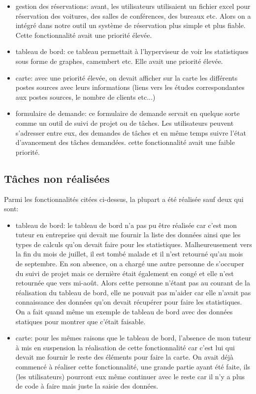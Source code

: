 \begin{itemize}
\item gestion des réservations: avant, les utilisateurs utilisaient un fichier excel pour réservation des voitures, des salles de conférences, des bureaux etc. Alors on a intégré dans notre outil un système de réservation plus simple et plus fiable. Cette fonctionnalité avait une priorité élevée.
\item tableau de bord: ce tableau permettait à l'hyperviseur de voir les statistiques sous forme de graphes, camembert etc. Elle avait une priorité élevée.
\item carte: avec une priorité élevée, on devait afficher sur la carte les différents postes sources avec leurs informations (liens vers les études correspondantes aux postes sources, le nombre de clients etc...)
\item formulaire de demande: ce formulaire de demande servait en quelque sorte comme un outil de suivi de projet ou de tâches. Les utilisateurs peuvent s'adresser entre eux, des demandes de tâches et en même temps suivre l'état d'avancement des tâches demandées. cette fonctionnalité avait une faible priorité.
\end{itemize}
\subsection*{Tâches non réalisées}\label{nonrealise}
Parmi les fonctionnalités citées ci-dessus, la plupart a été réalisée sauf deux qui sont: 
\begin{itemize}
\item tableau de bord: le tableau de bord n'a pas pu être réalisée car c'est mon tuteur en entreprise qui devait me fournir la liste des données ainsi que les types de calculs qu'on devait faire pour les statistiques. Malheureusement vers la fin du mois de juillet, il est tombé malade et il n'est retourné qu'au mois de septembre. En son absence, on a chargé une autre personne de s'occuper du suivi de projet mais ce dernière était également en congé et elle n'est retournée que vers mi-août. Alors cette personne n'étant pas au courant de la réalisation du tableau de bord, elle ne pouvait pas m'aider car elle n'avait pas connaissance des données qu'on devait récupérer pour faire les statistiques.\\
On a fait quand même un exemple de tableau de bord avec des données statiques pour montrer que c'était faisable.
\item carte: pour les mêmes raisons que le tableau de bord, l'absence de mon tuteur à mis en suspension la réalisation de cette fonctionnalité car c'est lui qui devait me fournir le reste des éléments pour faire la carte. On avait déjà commencé à réaliser cette fonctionnalité, une grande partie ayant été faite, ils (les utilisateurs) pourront eux même continuer avec le reste car il n'y a plus de code à faire mais juste la saisie des données.
\end{itemize}
